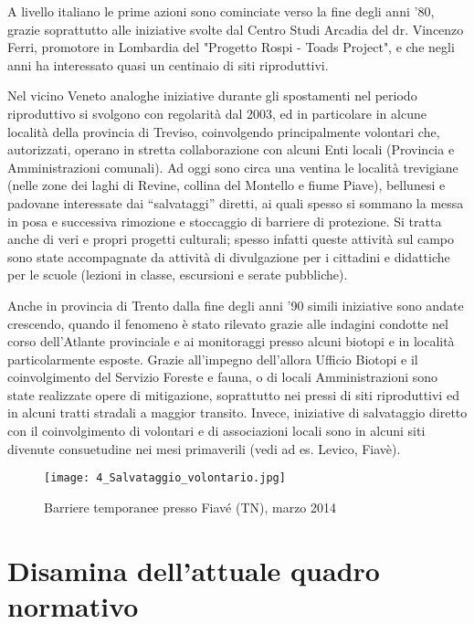 \documentclass[11pt,a4paper,twoside]{memoir}
\begin{document}
A livello italiano le prime azioni sono cominciate verso la fine degli anni '80, grazie soprattutto alle iniziative svolte dal Centro Studi Arcadia del dr. Vincenzo Ferri, promotore in Lombardia del "Progetto Rospi - Toads Project", e che negli anni ha interessato quasi un centinaio di siti riproduttivi. 

Nel vicino Veneto analoghe iniziative durante gli spostamenti nel periodo riproduttivo si svolgono con regolarità dal 2003, ed in particolare in alcune località della provincia di Treviso, coinvolgendo principalmente volontari che, autorizzati, operano in stretta collaborazione con alcuni Enti locali (Provincia e Amministrazioni comunali). Ad oggi sono circa una ventina le località trevigiane (nelle zone dei laghi di Revine, collina del Montello e fiume Piave), bellunesi e padovane interessate dai “salvataggi” diretti, ai quali spesso si sommano la messa in posa e successiva rimozione e stoccaggio di barriere di protezione. Si tratta anche di veri e propri progetti culturali; spesso infatti queste attività sul campo sono state accompagnate da attività di divulgazione per i cittadini e didattiche per le scuole (lezioni in classe, escursioni e serate pubbliche).

Anche in provincia di Trento dalla fine degli anni '90 simili iniziative sono andate crescendo, quando il fenomeno è stato rilevato grazie alle indagini condotte nel corso dell’Atlante provinciale e ai monitoraggi presso alcuni biotopi e in località particolarmente esposte. Grazie all’impegno dell’allora Ufficio Biotopi e il coinvolgimento del Servizio Foreste e fauna, o di locali Amministrazioni sono state realizzate opere di mitigazione, soprattutto nei pressi di siti riproduttivi ed in alcuni tratti stradali a maggior transito. Invece, iniziative di salvataggio diretto con il coinvolgimento di volontari e di associazioni locali sono in alcuni siti divenute consuetudine nei mesi primaverili (vedi ad es. Levico, Fiavè). 

\newpage
\begin{figure}[H]
\label{fig:barriere_fiave}
\centering
  \texttt{[image: 4\_Salvataggio\_volontario.jpg]}
\caption{Barriere temporanee presso Fiavé (TN), marzo 2014}
\end{figure}

\chapter{Disamina dell’attuale quadro normativo}
\label{chap:norme}
\end{document}
